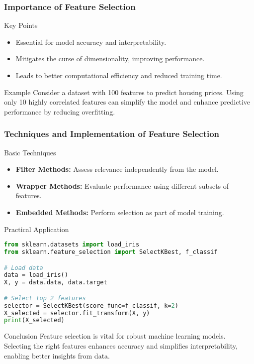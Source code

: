 \documentclass[aspectratio=169]{beamer}
\begin{document}
\begin{frame}[fragile]
    \frametitle{Importance of Feature Selection}

    \begin{block}{Key Points}
        \begin{itemize}
            \item Essential for model accuracy and interpretability.
            \item Mitigates the curse of dimensionality, improving performance.
            \item Leads to better computational efficiency and reduced training time.
        \end{itemize}
    \end{block}
    
    \begin{block}{Example}
        Consider a dataset with 100 features to predict housing prices. Using only 10 highly correlated features can simplify the model and enhance predictive performance by reducing overfitting.
    \end{block}
\end{frame}

\begin{frame}[fragile]
    \frametitle{Techniques and Implementation of Feature Selection}

    \begin{block}{Basic Techniques}
        \begin{itemize}
            \item \textbf{Filter Methods:} Assess relevance independently from the model.
            \item \textbf{Wrapper Methods:} Evaluate performance using different subsets of features.
            \item \textbf{Embedded Methods:} Perform selection as part of model training.
        \end{itemize}
    \end{block}
    
    \begin{block}{Practical Application}
        \begin{lstlisting}[language=Python]
from sklearn.datasets import load_iris
from sklearn.feature_selection import SelectKBest, f_classif

# Load data
data = load_iris()
X, y = data.data, data.target

# Select top 2 features
selector = SelectKBest(score_func=f_classif, k=2)
X_selected = selector.fit_transform(X, y)
print(X_selected)
        \end{lstlisting}
    \end{block}
    
    \begin{block}{Conclusion}
        Feature selection is vital for robust machine learning models. Selecting the right features enhances accuracy and simplifies interpretability, enabling better insights from data.
    \end{block}
\end{frame}
\end{document}
